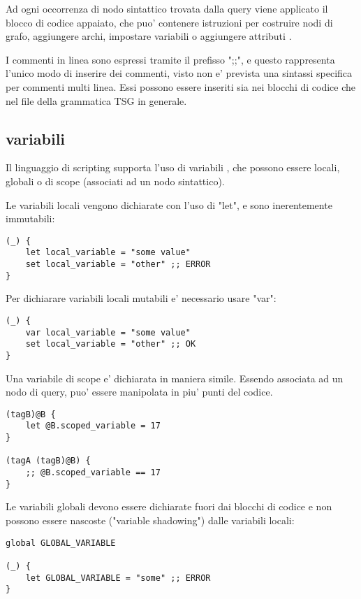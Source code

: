 Ad ogni occorrenza di nodo sintattico trovata dalla query viene applicato il blocco di codice appaiato, che puo' contenere istruzioni per costruire nodi di grafo, aggiungere archi, impostare variabili o aggiungere attributi \cite{TreeSitterGraphReferenceTerminology}.

I commenti in linea sono espressi tramite il prefisso ";;", e questo rappresenta l'unico modo di inserire dei commenti, visto non e' prevista una sintassi specifica per commenti multi linea.
Essi possono essere inseriti sia nei blocchi di codice che nel file della grammatica TSG in generale.

\subsection{variabili}
Il linguaggio di scripting supporta l'uso di variabili \cite{TreeSitterGraphReferenceVariables}, che possono essere locali, globali o di scope (associati ad un nodo sintattico).

Le variabili locali vengono dichiarate con l'uso di "let", e sono inerentemente immutabili:

\begin{lstlisting}
(_) {
    let local_variable = "some value"
    set local_variable = "other" ;; ERROR
}
\end{lstlisting}

Per dichiarare variabili locali mutabili e' necessario usare "var":

\begin{lstlisting}
(_) {
    var local_variable = "some value"
    set local_variable = "other" ;; OK
}
\end{lstlisting}

Una variabile di scope e' dichiarata in maniera simile. Essendo associata ad un nodo di query, puo' essere manipolata in piu' punti del codice.

\begin{lstlisting}
(tagB)@B {
    let @B.scoped_variable = 17
}

(tagA (tagB)@B) {
    ;; @B.scoped_variable == 17
}
\end{lstlisting}

Le variabili globali devono essere dichiarate fuori dai blocchi di codice e non possono essere nascoste ("variable shadowing") dalle variabili locali:

\begin{lstlisting}
global GLOBAL_VARIABLE

(_) {
    let GLOBAL_VARIABLE = "some" ;; ERROR
}
\end{lstlisting}

